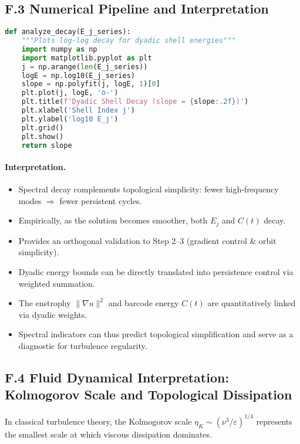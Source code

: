 \documentclass[11pt]{article}
\theoremstyle{definition}
\begin{document}
\subsection*{F.3 Numerical Pipeline and Interpretation}

\begin{lstlisting}[language=Python]
def analyze_decay(E_j_series):
    """Plots log-log decay for dyadic shell energies"""
    import numpy as np
    import matplotlib.pyplot as plt
    j = np.arange(len(E_j_series))
    logE = np.log10(E_j_series)
    slope = np.polyfit(j, logE, 1)[0]
    plt.plot(j, logE, 'o-')
    plt.title(f'Dyadic Shell Decay (slope = {slope:.2f})')
    plt.xlabel('Shell Index j')
    plt.ylabel('log10 E_j')
    plt.grid()
    plt.show()
    return slope
\end{lstlisting}

\paragraph{Interpretation.}
\begin{itemize}
  \item Spectral decay complements topological simplicity: fewer high-frequency modes \(\Rightarrow\) fewer persistent cycles.
  \item Empirically, as the solution becomes smoother, both \( E_j \) and \( C(t) \) decay.
  \item Provides an orthogonal validation to Step 2--3 (gradient control \& orbit simplicity).
  \item Dyadic energy bounds can be directly translated into persistence control via weighted summation.
  \item The enstrophy \( \|\nabla u\|^2 \) and barcode energy \( C(t) \) are quantitatively linked via dyadic weights.
  \item Spectral indicators can thus predict topological simplification and serve as a diagnostic for turbulence regularity.
\end{itemize}

\subsection*{F.4 Fluid Dynamical Interpretation: Kolmogorov Scale and Topological Dissipation}

In classical turbulence theory, the Kolmogorov scale \( \eta_K \sim (\nu^3 / \varepsilon)^{1/4} \) represents the smallest scale at which viscous dissipation dominates.
\end{document}
